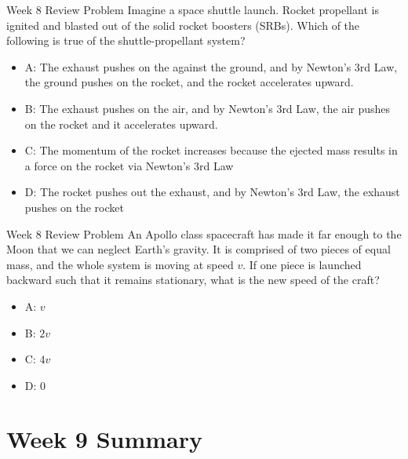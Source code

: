 \documentclass{beamer}
\begin{document}
\begin{frame}{Week 8 Review Problem}
\small Imagine a space shuttle launch.  Rocket propellant is ignited and blasted out of the solid rocket boosters (SRBs).  Which of the following is true of the shuttle-propellant system? \\
\begin{itemize}
\item A: The exhaust pushes on the against the ground, and by Newton's 3rd Law, the ground pushes on the rocket, and the rocket accelerates upward.
\item B: The exhaust pushes on the air, and by Newton's 3rd Law, the air pushes on the rocket and it accelerates upward.
\item C: The momentum of the rocket increases because the ejected mass results in a force on the rocket via Newton's 3rd Law
\item D: The rocket pushes out the exhaust, and by Newton's 3rd Law, the exhaust pushes on the rocket
\end{itemize}
\end{frame}

\begin{frame}{Week 8 Review Problem}
\small An Apollo class spacecraft has made it far enough to the Moon that we can neglect Earth's gravity.  It is comprised of two pieces of equal mass, and the whole system is moving at speed $v$.  If one piece is launched backward such that it remains stationary, what is the new speed of the craft?
\begin{itemize}
\item A: $v$
\item B: $2v$
\item C: $4v$
\item D: $0$
\end{itemize}
\end{frame}

\section{Week 9 Summary}
\end{document}
